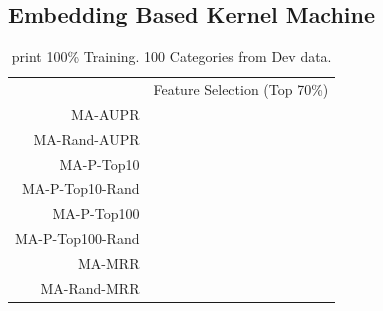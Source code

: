 \documentclass{article}
\renewcommand{\bullet}[0]{$\blacktriangleright$}
\begin{document}
\subsection{Embedding Based Kernel Machine}
\label{ssec:results-embedding-based-km}
\begin{table}[htbp]
  \centering
{}
  \begin{tabular}{r c }\toprule
                 & Feature Selection (Top 70\%) \\
MA-AUPR          &                         \\
MA-Rand-AUPR     &                         \\
MA-P-Top10       &                         \\
MA-P-Top10-Rand  &                         \\
MA-P-Top100      &                         \\
MA-P-Top100-Rand &                         \\
MA-MRR           &                         \\
MA-Rand-MRR      &                         \\
\bottomrule\end{tabular}
  \caption{print 100\% Training. 100 Categories from Dev data.}
  \label{tab:summary-embedding-based-km}
\end{table}

\end{document}

